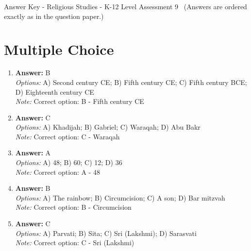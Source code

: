 \documentclass[12pt]{article}
\begin{document}
\begin{center}
Answer Key - Religious Studies - K-12 Level Assessment 9 \
\small (Answers are ordered exactly as in the question paper.)
\end{center}

\section*{Multiple Choice}
\begin{enumerate}[label=\arabic*.]
\item \textbf{Answer:} B
\\ \textit{Options:} A) Second century CE; B) Fifth century CE; C) Fifth century BCE; D) Eighteenth century CE
\\ \textit{Note:} Correct option: B - Fifth century CE
\item \textbf{Answer:} C
\\ \textit{Options:} A) Khadijah; B) Gabriel; C) Waraqah; D) Abu Bakr
\\ \textit{Note:} Correct option: C - Waraqah
\item \textbf{Answer:} A
\\ \textit{Options:} A) 48; B) 60; C) 12; D) 36
\\ \textit{Note:} Correct option: A - 48
\item \textbf{Answer:} B
\\ \textit{Options:} A) The rainbow; B) Circumcision; C) A son; D) Bar mitzvah
\\ \textit{Note:} Correct option: B - Circumcision
\item \textbf{Answer:} C
\\ \textit{Options:} A) Parvati; B) Sita; C) Sri (Lakshmi); D) Sarasvati
\\ \textit{Note:} Correct option: C - Sri (Lakshmi)
\end{enumerate}
\end{document}
